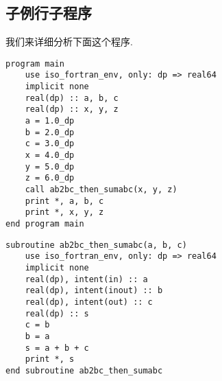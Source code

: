 \subsection{子例行子程序} 

我们来详细分析下面这个程序. 
\begin{lstlisting} 
program main
    use iso_fortran_env, only: dp => real64
    implicit none
    real(dp) :: a, b, c
    real(dp) :: x, y, z
    a = 1.0_dp
    b = 2.0_dp
    c = 3.0_dp
    x = 4.0_dp
    y = 5.0_dp
    z = 6.0_dp
    call ab2bc_then_sumabc(x, y, z)
    print *, a, b, c
    print *, x, y, z
end program main
\end{lstlisting}
\begin{lstlisting}
subroutine ab2bc_then_sumabc(a, b, c)
    use iso_fortran_env, only: dp => real64
    implicit none
    real(dp), intent(in) :: a
    real(dp), intent(inout) :: b
    real(dp), intent(out) :: c
    real(dp) :: s
    c = b
    b = a
    s = a + b + c
    print *, s
end subroutine ab2bc_then_sumabc
\end{lstlisting} 
